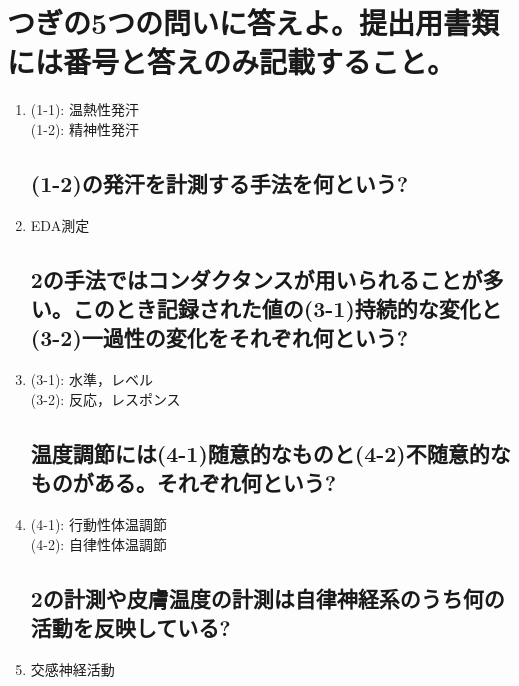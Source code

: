 \documentclass[titlepage,a4paper]{jsarticle}
\begin{document}
\section{つぎの5つの問いに答えよ。提出用書類には番号と答えのみ記載すること。}%
\begin{enumerate}
      \subsection{発汗には大きく分けて2種類の機能がある。(1-1)環境温度が高いときに起こる発汗と(1-2)緊張などによって起こる発汗をそれぞれ何という?}
      \item (1-1): 温熱性発汗\\
            (1-2): 精神性発汗
            \subsection{(1-2)の発汗を計測する手法を何という?}
      \item EDA測定
            \subsection{2の手法ではコンダクタンスが用いられることが多い。このとき記録された値の(3-1)持続的な変化と(3-2)一過性の変化をそれぞれ何という?}
      \item (3-1): 水準，レベル\\
            (3-2): 反応，レスポンス
            \subsection{温度調節には(4-1)随意的なものと(4-2)不随意的なものがある。それぞれ何という?}
      \item (4-1): 行動性体温調節\\
            (4-2): 自律性体温調節
            \subsection{2の計測や皮膚温度の計測は自律神経系のうち何の活動を反映している?}
      \item 交感神経活動
\end{enumerate}
\end{document}
